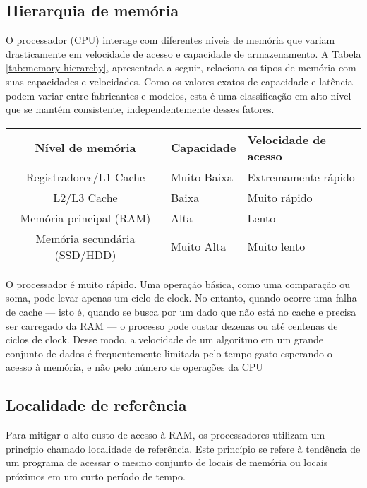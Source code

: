 \subsection{Hierarquia de memória}
O processador (CPU) interage com diferentes níveis de memória que variam drasticamente em velocidade de acesso e capacidade de armazenamento. A Tabela \ref{tab:memory-hierarchy}, apresentada a seguir, relaciona os tipos de memória com suas capacidades e velocidades. Como os valores exatos de capacidade e latência podem variar entre fabricantes e modelos, esta é uma classificação em alto nível que se mantém consistente, independentemente desses fatores.

\begin{table}[!h]
    \centering
    \begin{tabular}{ | c | l | l |  }
    \hline
    Nível de memória             & Capacidade  & Velocidade de acesso\\
    \hline
    Registradores/L1 Cache       & Muito Baixa & Extremamente rápido \\
    L2/L3 Cache                  & Baixa       & Muito rápido        \\
    Memória principal (RAM)      & Alta        & Lento               \\
    Memória secundária (SSD/HDD) & Muito Alta  & Muito lento         \\
    \hline
    \end{tabular}
\end{table}

O processador é muito rápido. Uma operação básica, como uma comparação ou soma, pode levar apenas um ciclo de clock. No entanto, quando ocorre uma falha de cache — isto é, quando se busca por um dado que não está no cache e precisa ser carregado da RAM — o processo pode custar dezenas ou até centenas de ciclos de clock. Desse modo, a velocidade de um algoritmo em um grande conjunto de dados é frequentemente limitada pelo tempo gasto esperando o acesso à memória, e não pelo número de operações da CPU


\subsection{Localidade de referência}\label{subsec:localidade-referencia}
Para mitigar o alto custo de acesso à RAM, os processadores utilizam um princípio chamado localidade de referência. Este princípio se refere à tendência de um programa de acessar o mesmo conjunto de locais de memória ou locais próximos em um curto período de tempo.


